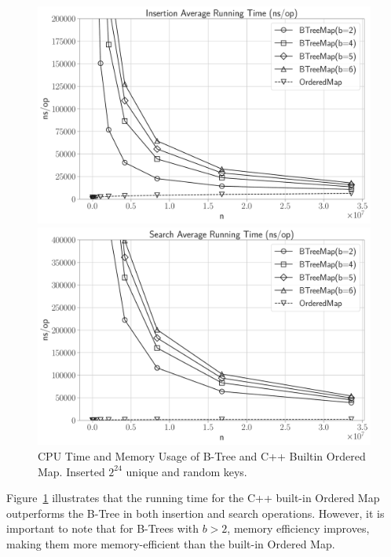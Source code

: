 \documentclass[12pt]{article}
\begin{document}
\begin{figure}[H]
\begin{minipage}{0.5\textwidth}
	\end{minipage}\hfill
	\begin{minipage}{0.5\textwidth}
		\centering
		\includegraphics[width=1\linewidth]{../notebook/plot/insertion_average_running_time_(ns_op).pdf}
	\end{minipage}\hfill
	\begin{minipage}{0.5\textwidth}
		\centering
		\includegraphics[width=1\linewidth]{../notebook/plot/search_average_running_time_(ns_op).pdf}
	\end{minipage}\hfill


	\caption{CPU Time and Memory Usage of B-Tree and C++ Builtin Ordered Map. Inserted $2^{24}$ unique and random keys.}
	\label{fig:om_vs_bt}
\end{figure}




Figure~\ref{fig:om_vs_bt} illustrates that the running time for the C++ built-in Ordered Map outperforms the B-Tree in both insertion and search operations. However, it is important to note that for B-Trees with $b > 2$, memory efficiency improves, making them more memory-efficient than the built-in Ordered Map.
\end{document}
